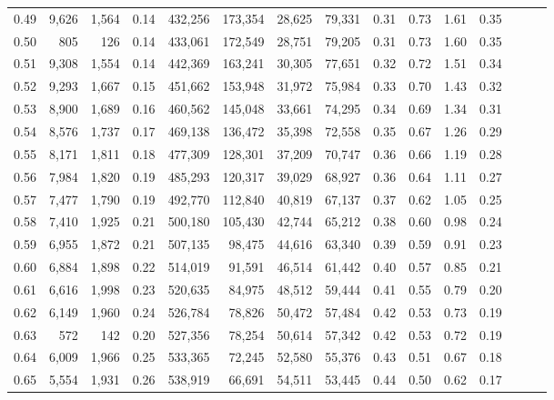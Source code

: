\begin{tabular}{rrrrrrrrrrrrrrr}
0.49 &   9,626 &  1,564 &  0.14 &  432,256 &  173,354 &   28,625 &   79,331 &  0.31 &  0.73 &  1.61 &      0.35 \\
0.50 &     805 &    126 &  0.14 &  433,061 &  172,549 &   28,751 &   79,205 &  0.31 &  0.73 &  1.60 &      0.35 \\
0.51 &   9,308 &  1,554 &  0.14 &  442,369 &  163,241 &   30,305 &   77,651 &  0.32 &  0.72 &  1.51 &      0.34 \\
0.52 &   9,293 &  1,667 &  0.15 &  451,662 &  153,948 &   31,972 &   75,984 &  0.33 &  0.70 &  1.43 &      0.32 \\
0.53 &   8,900 &  1,689 &  0.16 &  460,562 &  145,048 &   33,661 &   74,295 &  0.34 &  0.69 &  1.34 &      0.31 \\
0.54 &   8,576 &  1,737 &  0.17 &  469,138 &  136,472 &   35,398 &   72,558 &  0.35 &  0.67 &  1.26 &      0.29 \\
0.55 &   8,171 &  1,811 &  0.18 &  477,309 &  128,301 &   37,209 &   70,747 &  0.36 &  0.66 &  1.19 &      0.28 \\
0.56 &   7,984 &  1,820 &  0.19 &  485,293 &  120,317 &   39,029 &   68,927 &  0.36 &  0.64 &  1.11 &      0.27 \\
0.57 &   7,477 &  1,790 &  0.19 &  492,770 &  112,840 &   40,819 &   67,137 &  0.37 &  0.62 &  1.05 &      0.25 \\
0.58 &   7,410 &  1,925 &  0.21 &  500,180 &  105,430 &   42,744 &   65,212 &  0.38 &  0.60 &  0.98 &      0.24 \\
0.59 &   6,955 &  1,872 &  0.21 &  507,135 &   98,475 &   44,616 &   63,340 &  0.39 &  0.59 &  0.91 &      0.23 \\
0.60 &   6,884 &  1,898 &  0.22 &  514,019 &   91,591 &   46,514 &   61,442 &  0.40 &  0.57 &  0.85 &      0.21 \\
0.61 &   6,616 &  1,998 &  0.23 &  520,635 &   84,975 &   48,512 &   59,444 &  0.41 &  0.55 &  0.79 &      0.20 \\
0.62 &   6,149 &  1,960 &  0.24 &  526,784 &   78,826 &   50,472 &   57,484 &  0.42 &  0.53 &  0.73 &      0.19 \\
0.63 &     572 &    142 &  0.20 &  527,356 &   78,254 &   50,614 &   57,342 &  0.42 &  0.53 &  0.72 &      0.19 \\
0.64 &   6,009 &  1,966 &  0.25 &  533,365 &   72,245 &   52,580 &   55,376 &  0.43 &  0.51 &  0.67 &      0.18 \\
0.65 &   5,554 &  1,931 &  0.26 &  538,919 &   66,691 &   54,511 &   53,445 &  0.44 &  0.50 &  0.62 &      0.17 \\

\end{tabular}
